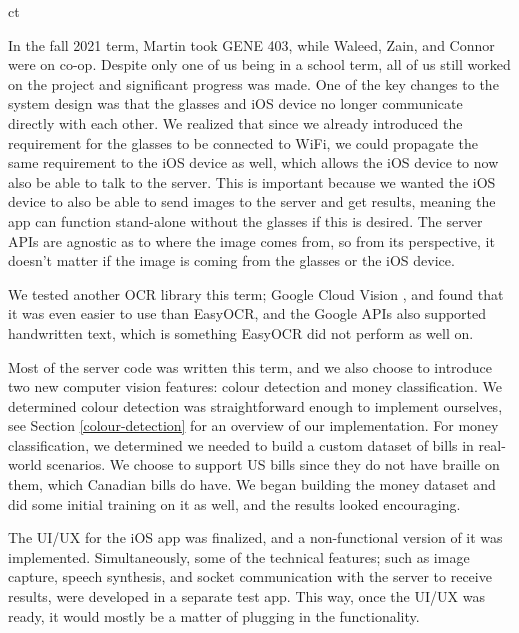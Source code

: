ct\documentclass[a4paper,11pt]{article}
\begin{document}
In the fall 2021 term, Martin took GENE 403, while Waleed, Zain, and Connor were on co-op. Despite only one of us being in a school term, all of us still worked on the project and significant progress was made. One of the key changes to the system design was that the glasses and iOS device no longer communicate directly with each other. We realized that since we already introduced the requirement for the glasses to be connected to WiFi, we could propagate the same requirement to the iOS device as well, which allows the iOS device to now also be able to talk to the server. This is important because we wanted the iOS device to also be able to send images to the server and get results, meaning the app can function stand-alone without the glasses if this is desired. The server APIs are agnostic as to where the image comes from, so from its perspective, it doesn't matter if the image is coming from the glasses or the iOS device.

We tested another OCR library this term; Google Cloud Vision \cite{google-vision-api}, and found that it was even easier to use than EasyOCR, and the Google APIs also supported handwritten text, which is something EasyOCR did not perform as well on.

Most of the server code was written this term, and we also choose to introduce two new computer vision features: colour detection and money classification. We determined colour detection was straightforward enough to implement ourselves, see Section \ref{colour-detection} for an overview of our implementation. For money classification, we determined we needed to build a custom dataset of bills in real-world scenarios. We choose to support US bills since they do not have braille on them, which Canadian bills do have. We began building the money dataset and did some initial training on it as well, and the results looked encouraging.

The UI/UX for the iOS app was finalized, and a non-functional version of it was implemented. Simultaneously, some of the technical features; such as image capture, speech synthesis, and socket communication with the server to receive results, were developed in a separate test app. This way, once the UI/UX was ready, it would mostly be a matter of plugging in the functionality.
\end{document}
